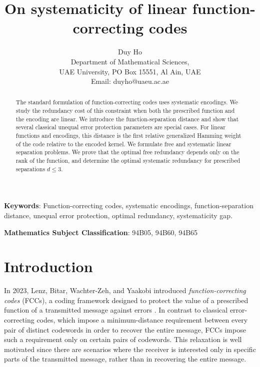 \documentclass[a4paper,12pt]{article}
\theoremstyle{plain}
\theoremstyle{definition}
\begin{document}
\title{On systematicity of linear function-correcting codes}
\author{Duy Ho \\
Department of Mathematical Sciences, \\
UAE University, PO Box 15551, Al Ain, UAE\\ 
Email: duyho@uaeu.ac.ae }
\date{}
\maketitle

\begin{abstract}
The standard formulation of function-correcting codes uses systematic encodings. 
We study the redundancy cost of this constraint
when both the prescribed function and the encoding are linear.
We introduce the function-separation distance and show that several classical unequal error protection parameters are special cases.
For linear functions and encodings, this distance is the first relative generalized Hamming weight of the code relative to the encoded kernel. 
We formulate free and systematic linear separation problems. 
We prove that the optimal free redundancy depends only on the rank of the function, and determine the optimal systematic redundancy for prescribed separations $d\leq3$. 
\end{abstract}

\textbf{Keywords}: 
Function-correcting codes, systematic encodings,
function-separation distance, unequal error protection, optimal redundancy, systematicity gap.

\textbf{Mathematics Subject Classification}: 94B05, 94B60, 94B65



\section{Introduction}
\label{sec:intro}
In 2023, Lenz, Bitar, Wachter-Zeh, and Yaakobi introduced
\emph{function-correcting codes} (FCCs), a coding framework designed
to protect the value of a prescribed function of a transmitted message against errors \cite{lenz2023}. 
In contrast to classical error-correcting codes, which impose a minimum-distance requirement between every pair of distinct codewords in order to recover the entire message,  FCCs impose such a requirement only on certain pairs of codewords. 
This relaxation is well motivated since there are scenarios  where the receiver is interested only in specific parts of the
transmitted message, rather than in recovering the entire message.
\end{document}
